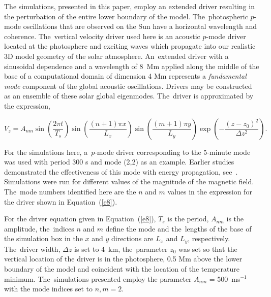 \documentclass[physics,article,accept,pdftex,moreauthors]{Definitions/mdpi}
\begin{document}
The simulations, presented in this paper, employ an extended driver resulting in the perturbation of the entire lower boundary of the model.  The~photospheric $p$-mode oscillations  that are observed on the Sun have a horizontal wavelength and coherence. The~vertical velocity driver used here is an acoustic $p$-mode driver located at the photosphere and exciting waves which propagate into our realistic 3D model geometry of the solar atmosphere. An~extended driver with a sinusoidal dependence and a wavelength of 8~Mm applied along the middle of the base of a computational domain of dimension 4 Mm represents  a 
 {{\it fundamental mode}} %
component of the global acoustic oscillations. Drivers may be constructed as an ensemble of these solar global eigenmodes. The~driver is approximated by the 
 {expression,} %


\begin{equation}
 V_{z}  =  A_{nm} \sin\left(\frac{2\pi t}{T_s} \right)\sin\left(  \frac{(n+1)\pi x}{L_x} \right)  
 \sin\left(\frac{(m+1)\pi y}{L_y} \right) \exp\left( -\frac{(z-z_0)^2}{\Delta z^2} \right). %
\label{e8}
\end{equation}

For the  simulations here, a~$p$-mode driver corresponding to the 5-minute mode was used with period 300 s and mode (2,2) as an example. Earlier studies demonstrated the effectiveness of this mode with energy propagation, see~\cite{Griffiths2018b}. Simulations were run for different values of the magnitude of the magnetic field. The~mode numbers identified here are the $n$ and $m$ values in the expression for the driver shown in Equation~(\ref{e8}).











For the driver equation given in Equation~(\ref{e8}), $T_{s}$ is the period, $A_{nm}$ is the amplitude, the~indices $n$ and $m$ define the mode and the~lengths of the base of the simulation box in the $x$ and $y$ directions are $L_{x}$ and $L_{y}$, respectively. The~driver width, $\Delta z$ is set to $4$~km, the~parameter $z_{0}$ was set so that the vertical location of the driver is in the photosphere, 0.5 Mm above the lower boundary of the model and coincident with the location of the temperature minimum. The~simulations presented employ the parameter $A_{nm}$ = 500\, ms$^{-1}$ with the mode indices set to $n,m=2$. 
\end{document}
